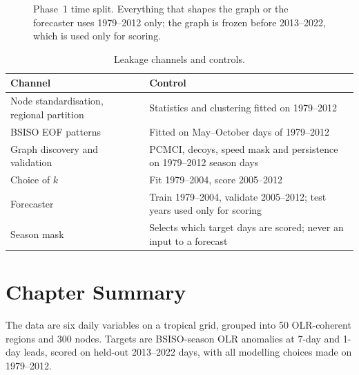 \begin{figure}[htbp]
\centering
{}
\caption{Phase~1 time split. Everything that shapes the graph or the forecaster uses 1979--2012 only; the graph is frozen before 2013--2022, which is used only for scoring.}
\label{fig:timesplit}
\end{figure}

\begin{table}[htbp]
\centering
\caption{Leakage channels and controls.}
\label{tab:leakage}
\footnotesize
\renewcommand{\arraystretch}{1.15}
\begin{tabularx}{\textwidth}{>{\raggedright\arraybackslash}p{4.2cm}>{\raggedright\arraybackslash}X}
\toprule
\textbf{Channel} & \textbf{Control} \\
\midrule
Node standardisation, regional partition & Statistics and clustering fitted on 1979--2012 \\
BSISO EOF patterns & Fitted on May--October days of 1979--2012 \\
Graph discovery and validation & PCMCI, decoys, speed mask and persistence on 1979--2012 season days \\
Choice of $k$ & Fit 1979--2004, score 2005--2012 \\
Forecaster & Train 1979--2004, validate 2005--2012; test years used only for scoring \\
Season mask & Selects which target days are scored; never an input to a forecast \\
\bottomrule
\end{tabularx}
\end{table}

\section{Chapter Summary}

The data are six daily variables on a tropical grid, grouped into 50 OLR-coherent regions and 300 nodes. Targets are BSISO-season OLR anomalies at 7-day and 1-day leads, scored on held-out 2013--2022 days, with all modelling choices made on 1979--2012.
